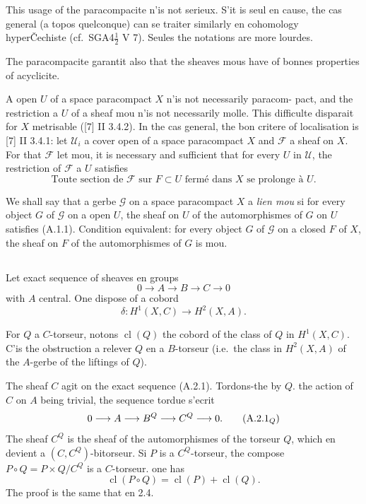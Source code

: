 \documentclass[11pt,a4paper]{article}
\theoremstyle{plain}
\theoremstyle{definition}
\DeclareMathOperator{\cl}{cl}
\begin{document}
This usage of the paracompacite n'is not serieux. S'it is seul en cause, the cas
general (a topos quelconque) can se traiter similarly en cohomology hyper\v{C}echiste
(cf.~SGA4$\tfrac{1}{2}$ V 7). Seules the notations are more lourdes.

The paracompacite garantit also that the sheaves mous have of bonnes properties of acyclicite.

A open $U$ of a space paracompact $X$ n'is not necessarily paracom-
pact, and the restriction a $U$ of a sheaf mou n'is not necessarily molle. This difficulte disparait for $X$ metrisable ([7] II 3.4.2). In the cas general, the bon critere of localisation is [7] II 3.4.1: let $\mathcal{U}_{i}$ a cover open of a space
paracompact $X$ and $\mathcal{F}$ a sheaf on $X$. For that $\mathcal{F}$ let mou, it is necessary and sufficient
that for every $U$ in $\mathcal{U}$, the restriction of $\mathcal{F}$ a $U$ satisfies
\[
\text{Toute section de } \mathcal{F} \text{ sur } F \subset U \text{ ferm\'e dans } X \text{ se prolonge \`a } U. \tag{A.1.1}
\]

We shall say that a gerbe $\mathcal{G}$ on a space paracompact $X$ a \emph{lien mou} si
for every object $G$ of $\mathcal{G}$ on a open $U$, the sheaf on $U$ of the automorphismes of
$G$ on $U$ satisfies (A.1.1). Condition equivalent: for every object $G$ of $\mathcal{G}$ on a closed
$F$ of $X$, the sheaf on $F$ of the automorphismes of $G$ is mou.

\subsection{}
Let exact sequence of sheaves en groups
\begin{equation}
0 \longrightarrow A \longrightarrow B \longrightarrow C \longrightarrow 0 \tag{A.2.1}
\end{equation}
with $A$ central. One dispose of a cobord
\begin{equation}
\delta: H^{1}(X, C) \longrightarrow H^{2}(X, A). \tag{A.2.2}
\end{equation}

For $Q$ a $C$-torseur, notons $\cl(Q)$ the cobord of the class of $Q$ in $H^{1}(X,C)$. C'is the obstruction a relever $Q$ en a $B$-torseur (i.e.\ the class in $H^{2}(X, A)$ of the $A$-gerbe of the liftings of $Q$).

The sheaf $C$ agit on the exact sequence (A.2.1). Tordons-the by $Q$. the action of $C$
on $A$ being trivial, the sequence tordue s'ecrit
\begin{equation}
0 \longrightarrow A \longrightarrow B^{Q} \longrightarrow C^{Q} \longrightarrow 0. \tag{A.2.1$_{Q}$}
\end{equation}
The sheaf $C^{Q}$ is the sheaf of the automorphismes of the torseur $Q$, which en devient a $(C, C^{Q})$-bitorseur. Si $P$ is a $C^{Q}$-torseur, the compose $P \circ Q = P \times Q/C^{Q}$ is a
$C$-torseur. one has
\begin{equation}
\cl(P \circ Q) = \cl(P) + \cl(Q). \tag{A.2.3}
\end{equation}
The proof is the same that en 2.4.
\end{document}
